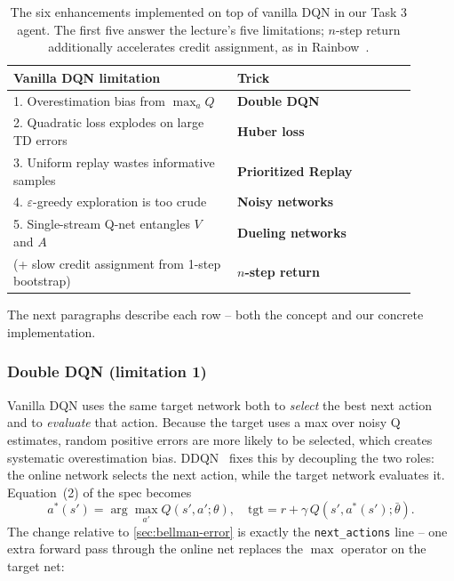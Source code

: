 \documentclass[10pt,twocolumn,letterpaper]{article}
\begin{document}
\begin{table}[h]
    \centering
    \footnotesize
    \begin{tabular}{p{0.50\linewidth}p{0.40\linewidth}}
        \toprule
        \textbf{Vanilla DQN limitation} & \textbf{Trick} \\ \midrule
        1. Overestimation bias from $\max_a Q$            & \textbf{Double DQN} \\
        2. Quadratic loss explodes on large TD errors     & \textbf{Huber loss} \\
        3. Uniform replay wastes informative samples      & \textbf{Prioritized Replay} \\
        4. $\varepsilon$-greedy exploration is too crude  & \textbf{Noisy networks} \\
        5. Single-stream Q-net entangles $V$ and $A$      & \textbf{Dueling networks} \\
        \midrule
        (+ slow credit assignment from 1-step bootstrap)  & \textbf{$n$-step return} \\
        \bottomrule
    \end{tabular}
    \caption{The six enhancements implemented on top of vanilla DQN in our Task 3 agent. The first five answer the lecture's five limitations; $n$-step return additionally accelerates credit assignment, as in Rainbow~\cite{hessel2018rainbow}.}
    \label{tab:tricks}
\end{table}

The next paragraphs describe each row -- both the concept and our concrete implementation.

\subsubsection{Double DQN (limitation 1)}

Vanilla DQN uses the same target network both to \emph{select} the best next action and to \emph{evaluate} that action. Because the target uses a max over noisy Q estimates, random positive errors are more likely to be selected, which creates systematic overestimation bias. DDQN~\cite{hasselt2016ddqn} fixes this by decoupling the two roles: the online network selects the next action, while the target network evaluates it. Equation~(2) of the spec becomes
\[
    a^*(s') = \arg\max_{a'} Q(s', a';\theta), \quad \mathrm{tgt} = r + \gamma\, Q(s', a^*(s');\bar\theta).
\]
The change relative to \cref{sec:bellman-error} is exactly the \texttt{next\_actions} line -- one extra forward pass through the online net replaces the $\max$ operator on the target net:
\end{document}
